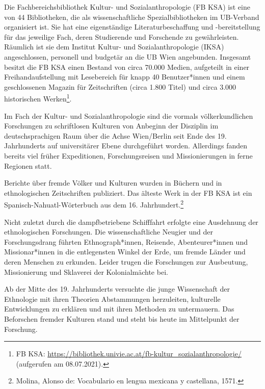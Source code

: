 \documentclass[a4paper,
fontsize=11pt,
oneside,
numbers=noperiodatend,
parskip=half-,
bibliography=totoc,
final
]{scrartcl}
\begin{document}
Die Fachbereichsbibliothek Kultur- und Sozialanthropologie (FB KSA) ist
eine von 44 Bibliotheken, die als wissenschaftliche Spezialbibliotheken
im UB-Verband organisiert ist. Sie hat eine eigenständige
Literaturbeschaffung und -bereitstellung für das jeweilige Fach, deren
Studierende und Forschende zu gewährleisten. Räumlich ist sie dem
Institut Kultur- und Sozialanthropologie (IKSA) angeschlossen, personell
und budgetär an die UB Wien angebunden. Insgesamt besitzt die FB KSA
einen Bestand von circa 70.000 Medien, aufgeteilt in einer
Freihandaufstellung mit Lesebereich für knapp 40 Benutzer*innen und
einem geschlossenen Magazin für Zeitschriften (circa 1.800 Titel) und
circa 3.000 historischen Werken\footnote{FB KSA:
  \url{https://bibliothek.univie.ac.at/fb-kultur_sozialanthropologie/}
  (aufgerufen am 08.07.2021).}.

Im Fach der Kultur- und Sozialanthropologie sind die vormals
völkerkundlichen Forschungen zu schriftlosen Kulturen von Anbeginn der
Disziplin im deutschsprachigen Raum über die Achse Wien/Berlin seit Ende
des 19. Jahrhunderts auf universitärer Ebene durchgeführt worden.
Allerdings fanden bereits viel früher Expeditionen, Forschungsreisen und
Missionierungen in ferne Regionen statt.

Berichte über fremde Völker und Kulturen wurden in Büchern und in
ethnologischen Zeitschriften publiziert. Das älteste Werk in der FB KSA
ist ein Spanisch-Nahuatl-Wörterbuch aus dem 16. Jahrhundert.\footnote{Molina,
  Alonso de: Vocabulario en lengua mexicana y castellana, 1571.}

Nicht zuletzt durch die dampfbetriebene Schifffahrt erfolgte eine
Ausdehnung der ethnologischen Forschungen. Die wissenschaftliche Neugier
und der Forschungsdrang führten Ethnograph*innen, Reisende,
Abenteurer*innen und Missionar*innen in die entlegensten Winkel der
Erde, um fremde Länder und deren Menschen zu erkunden. Leider trugen die
Forschungen zur Ausbeutung, Missionierung und Sklaverei der
Kolonialmächte bei.

Ab der Mitte des 19. Jahrhunderts versuchte die junge Wissenschaft der
Ethnologie mit ihren Theorien Abstammungen herzuleiten, kulturelle
Entwicklungen zu erklären und mit ihren Methoden zu untermauern. Das
Beforschen fremder Kulturen stand und steht bis heute im Mittelpunkt der
Forschung.
\end{document}

